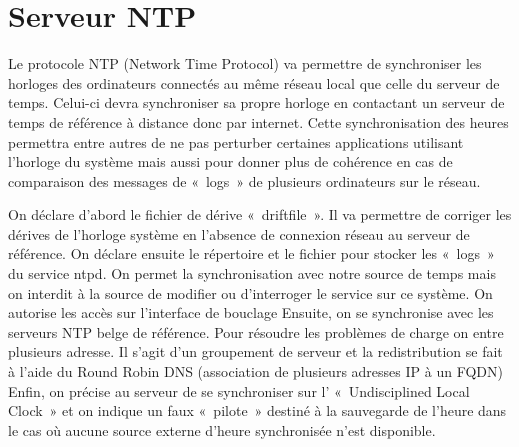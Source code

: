 \section{Serveur NTP}
Le protocole NTP (Network Time Protocol) va permettre de synchroniser les horloges des ordinateurs connectés au même réseau local que celle du serveur de temps.
Celui-ci devra synchroniser sa propre horloge en contactant un serveur de temps de référence à distance donc  par internet.
Cette synchronisation des heures permettra entre autres de ne pas perturber certaines applications utilisant l’horloge du système mais aussi pour donner plus de cohérence en cas de comparaison des messages de « logs » de plusieurs ordinateurs sur le réseau.



On déclare d’abord le fichier de dérive « driftfile ». Il va permettre de corriger les dérives de l’horloge système en l’absence de connexion réseau au serveur de référence.
On déclare ensuite le répertoire et le fichier pour stocker les « logs » du service ntpd. 
On permet la synchronisation avec notre source de temps mais on interdit à la source de modifier ou d’interroger le service sur ce système.
On autorise les accès sur l’interface de bouclage
Ensuite, on se synchronise avec les serveurs NTP belge de référence. Pour résoudre les problèmes de charge on entre plusieurs adresse. Il s’agit d’un groupement de serveur et la redistribution se fait à l’aide du Round Robin DNS (association de plusieurs adresses IP à un FQDN)
Enfin, on précise au serveur de se synchroniser sur l’ « Undisciplined Local Clock » et on indique un faux « pilote » destiné à la sauvegarde de l’heure dans le cas où aucune source externe d’heure synchronisée n’est disponible.
